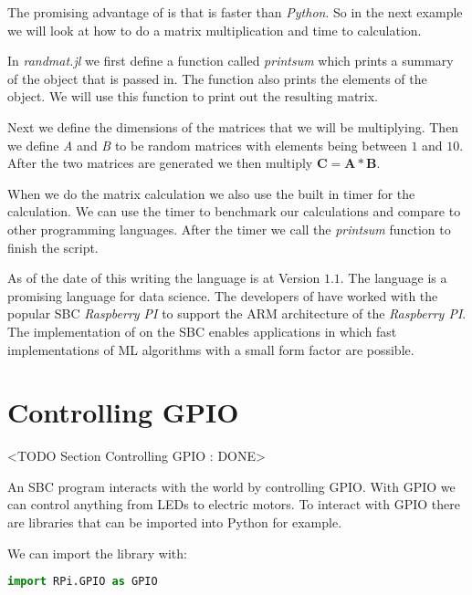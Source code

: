 	

The promising advantage of \emph{} is that \emph{} is faster than \emph{Python}. So in the next example we will look at how to do a matrix multiplication and time to calculation.

In \emph{randmat.jl} we first define a function called \emph{printsum} which prints a summary of the object that is passed in. The function also prints the elements of the object. We will use this function to print out the resulting matrix. 

Next we define the dimensions of the matrices that we will be multiplying. Then we define \emph{A} and \emph{B} to be random matrices with elements being between $1$ and $10$. After the two matrices are generated we then multiply $\mathbf{C}=\mathbf{A}*\mathbf{B}$. 

When we do the matrix calculation we also use the built in timer for the calculation. We can use the timer to benchmark our calculations and compare to other programming languages. After the timer we call the \emph{printsum} function to finish the script.

	
	
As of the date of this writing the \emph{} language is at Version $1.1$. The \emph{} language is a promising language for data science. The developers of \emph{} have worked with the popular \ac{SBC} \emph{Raspberry PI} to support the \ac{ARM} architecture of the \emph{Raspberry PI}. The implementation of \emph{} on the \ac{SBC} enables applications in which fast implementations of \ac{ML} algorithms with a small form factor are possible. 

\section{Controlling GPIO}
	<TODO Section Controlling GPIO : DONE>

An \ac{SBC} program interacts with the world by controlling \ac{GPIO}. With \ac{GPIO} we can control anything from \ac{LED}s to electric motors. To interact with \ac{GPIO} there are libraries that can be imported into Python for example. 

We can import the   library with:

\begin{lstlisting}[language=python]
    import RPi.GPIO as GPIO
\end{lstlisting}

